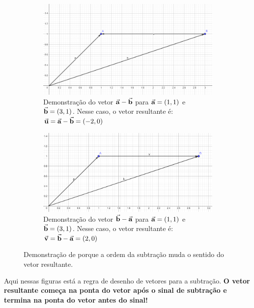 \documentclass[12pt]{extarticle}
\newcommand{\<}{\langle}
\renewcommand{\>}{\rangle}
\theoremstyle{definition}
\begin{document}
\begin{figure}[H]
    \centering
    \begin{subfigure}[b]{0.4\textwidth}
         \centering
         \includegraphics[width=\textwidth]{A-B_vector.png}
         \caption{Demonstração do vetor $\va{a} - \va{b}$ para $\va{a}=(1,1)$ e $\va{b} = (3,1)$. Nesse caso, o vetor resultante é: $\va{u} = \va{a} - \va{b} = (-2,0)$}
         \label{fig:a-b_vec}
     \end{subfigure}
     \hfill
     \begin{subfigure}[b]{0.4\textwidth}
         \centering
         \includegraphics[width=\textwidth]{b-a_vec.png}
         \caption{Demonstração do vetor $\va{b} - \va{a}$ para $\va{a}=(1,1)$ e $\va{b} = (3,1)$. Nesse caso, o vetor resultante é: $\va{v} = \va{b} - \va{a} = (2,0)$}
         \label{fig:b-a_vec}
     \end{subfigure}
    \caption{Demonstração de porque a ordem da subtração muda o sentido do vetor resultante.}
    \label{fig:my_label}
\end{figure}

Aqui nessas figuras está a regra de desenho de vetores para a subtração. \textbf{O vetor resultante começa na ponta do vetor após o sinal de subtração e termina na ponta do vetor antes do sinal!}
\end{document}
